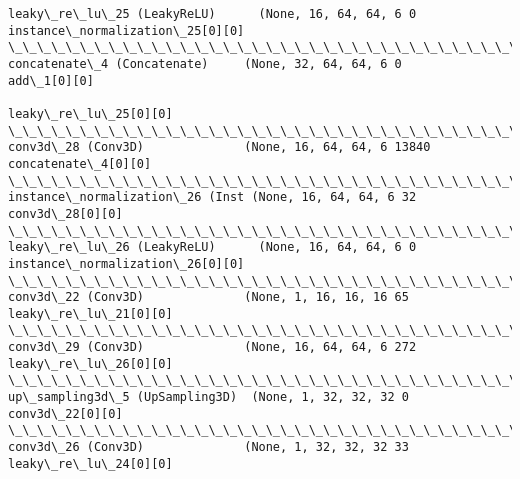 \documentclass[11pt]{article}
\begin{document}
\begin{Verbatim}[commandchars=\\\{\}]
leaky\_re\_lu\_25 (LeakyReLU)      (None, 16, 64, 64, 6 0           instance\_normalization\_25[0][0]  
\_\_\_\_\_\_\_\_\_\_\_\_\_\_\_\_\_\_\_\_\_\_\_\_\_\_\_\_\_\_\_\_\_\_\_\_\_\_\_\_\_\_\_\_\_\_\_\_\_\_\_\_\_\_\_\_\_\_\_\_\_\_\_\_\_\_\_\_\_\_\_\_\_\_\_\_\_\_\_\_\_\_\_\_\_\_\_\_\_\_\_\_\_\_\_\_\_\_
concatenate\_4 (Concatenate)     (None, 32, 64, 64, 6 0           add\_1[0][0]                      
                                                                 leaky\_re\_lu\_25[0][0]             
\_\_\_\_\_\_\_\_\_\_\_\_\_\_\_\_\_\_\_\_\_\_\_\_\_\_\_\_\_\_\_\_\_\_\_\_\_\_\_\_\_\_\_\_\_\_\_\_\_\_\_\_\_\_\_\_\_\_\_\_\_\_\_\_\_\_\_\_\_\_\_\_\_\_\_\_\_\_\_\_\_\_\_\_\_\_\_\_\_\_\_\_\_\_\_\_\_\_
conv3d\_28 (Conv3D)              (None, 16, 64, 64, 6 13840       concatenate\_4[0][0]              
\_\_\_\_\_\_\_\_\_\_\_\_\_\_\_\_\_\_\_\_\_\_\_\_\_\_\_\_\_\_\_\_\_\_\_\_\_\_\_\_\_\_\_\_\_\_\_\_\_\_\_\_\_\_\_\_\_\_\_\_\_\_\_\_\_\_\_\_\_\_\_\_\_\_\_\_\_\_\_\_\_\_\_\_\_\_\_\_\_\_\_\_\_\_\_\_\_\_
instance\_normalization\_26 (Inst (None, 16, 64, 64, 6 32          conv3d\_28[0][0]                  
\_\_\_\_\_\_\_\_\_\_\_\_\_\_\_\_\_\_\_\_\_\_\_\_\_\_\_\_\_\_\_\_\_\_\_\_\_\_\_\_\_\_\_\_\_\_\_\_\_\_\_\_\_\_\_\_\_\_\_\_\_\_\_\_\_\_\_\_\_\_\_\_\_\_\_\_\_\_\_\_\_\_\_\_\_\_\_\_\_\_\_\_\_\_\_\_\_\_
leaky\_re\_lu\_26 (LeakyReLU)      (None, 16, 64, 64, 6 0           instance\_normalization\_26[0][0]  
\_\_\_\_\_\_\_\_\_\_\_\_\_\_\_\_\_\_\_\_\_\_\_\_\_\_\_\_\_\_\_\_\_\_\_\_\_\_\_\_\_\_\_\_\_\_\_\_\_\_\_\_\_\_\_\_\_\_\_\_\_\_\_\_\_\_\_\_\_\_\_\_\_\_\_\_\_\_\_\_\_\_\_\_\_\_\_\_\_\_\_\_\_\_\_\_\_\_
conv3d\_22 (Conv3D)              (None, 1, 16, 16, 16 65          leaky\_re\_lu\_21[0][0]             
\_\_\_\_\_\_\_\_\_\_\_\_\_\_\_\_\_\_\_\_\_\_\_\_\_\_\_\_\_\_\_\_\_\_\_\_\_\_\_\_\_\_\_\_\_\_\_\_\_\_\_\_\_\_\_\_\_\_\_\_\_\_\_\_\_\_\_\_\_\_\_\_\_\_\_\_\_\_\_\_\_\_\_\_\_\_\_\_\_\_\_\_\_\_\_\_\_\_
conv3d\_29 (Conv3D)              (None, 16, 64, 64, 6 272         leaky\_re\_lu\_26[0][0]             
\_\_\_\_\_\_\_\_\_\_\_\_\_\_\_\_\_\_\_\_\_\_\_\_\_\_\_\_\_\_\_\_\_\_\_\_\_\_\_\_\_\_\_\_\_\_\_\_\_\_\_\_\_\_\_\_\_\_\_\_\_\_\_\_\_\_\_\_\_\_\_\_\_\_\_\_\_\_\_\_\_\_\_\_\_\_\_\_\_\_\_\_\_\_\_\_\_\_
up\_sampling3d\_5 (UpSampling3D)  (None, 1, 32, 32, 32 0           conv3d\_22[0][0]                  
\_\_\_\_\_\_\_\_\_\_\_\_\_\_\_\_\_\_\_\_\_\_\_\_\_\_\_\_\_\_\_\_\_\_\_\_\_\_\_\_\_\_\_\_\_\_\_\_\_\_\_\_\_\_\_\_\_\_\_\_\_\_\_\_\_\_\_\_\_\_\_\_\_\_\_\_\_\_\_\_\_\_\_\_\_\_\_\_\_\_\_\_\_\_\_\_\_\_
conv3d\_26 (Conv3D)              (None, 1, 32, 32, 32 33          leaky\_re\_lu\_24[0][0]             

\end{Verbatim}
\end{document}
